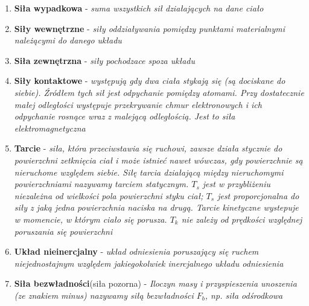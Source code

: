 \documentclass[12pt,twoside,a4paper]{book}
\begin{document}
\begin{enumerate}[label=(\alph*)]
\item\textbf{Siła wypadkowa} - \textit{suma wszystkich sił działających na dane ciało}
\item\textbf{Siły wewnętrzne} - \textit{siły oddziaływania pomiędzy punktami materialnymi należącymi do danego układu}
\item\textbf{Siła zewnętrzna} - \textit{siły pochodzace spoza układu}
\item\textbf{Siły kontaktowe} - \textit{występują gdy dwa ciała stykają się (są dociskane do siebie). Źródłem tych sił jest odpychanie pomiędzy atomami. Przy dostatecznie małej odległości występuje
przekrywanie chmur elektronowych i ich odpychanie rosnące wraz z malejącą odległością.
Jest to siła elektromagnetyczna}
\item\textbf{Tarcie} - \textit{siła, która przeciwstawia się ruchowi, zawsze działa stycznie do powierzchni zetknięcia ciał i może istnieć nawet wówczas, gdy powierzchnie są nieruchome względem siebie. Siłę tarcia działającą między nieruchomymi powierzchniami nazywamy tarciem statycznym. $T_s$ jest w przybliżeniu niezależna od wielkości pola powierzchni styku ciał; $T_s$ jest proporcjonalna do siły z jaką jedna powierzchnia naciska na drugą. Tarcie kinetyczne wystepuje w momencie, w którym ciało się porusza. $T_k$ nie zależy od prędkości względnej poruszania się powierzchni}
\item\textbf{Układ nieinercjalny} - \textit{układ odniesienia poruszający się ruchem niejednostajnym względem jakiegokolwiek inercjalnego układu odniesienia}
\item\textbf{Siła bezwładności}(siła pozorna) - \textit{Iloczyn masy i przyspieszenia unoszenia (ze znakiem minus) nazywamy siłą bezwładności $F_b$, np. siła odśrodkowa}

\end{enumerate}
\end{document}
